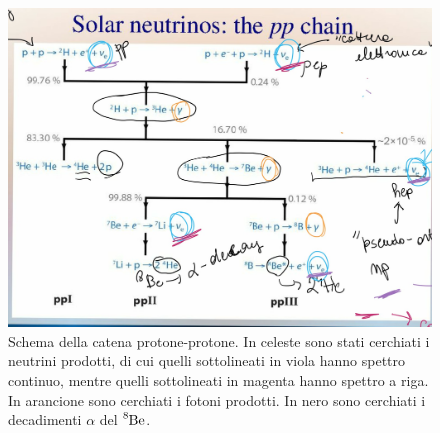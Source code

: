 \begin{figure}[h]
    \centering
    \includegraphics[scale=0.3
    ]{Immagini/0318_solarnu.png}
    \caption{Schema della catena protone-protone. In celeste sono stati cerchiati i neutrini prodotti, di cui quelli sottolineati in viola hanno spettro continuo, mentre quelli sottolineati in magenta hanno spettro a riga. In arancione sono cerchiati i fotoni prodotti. In nero sono cerchiati i decadimenti $\alpha$ del $\ce{^8Be}$.}
    \label{0318_solnu}
\end{figure}


